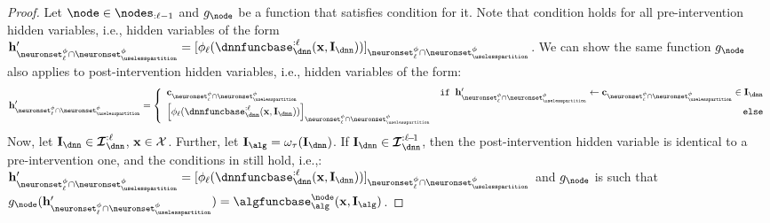 \begin{proof}
    Let $\node \in \nodes_{:\layer-1}$ and $g_{\node}$ be a function that satisfies condition  for it.
    Note that condition  holds for all pre-intervention hidden variables, i.e., hidden variables of the form $\hiddenstates'_{\neuronset^{\causalmap}_{\layer} \cap \neuronset^{\causalmap}_{\uselesspartition}} = [\causalmap_{\layer}(\dnnfunclayer{:\layer}(\bx, \interventionsdnn))]_{\neuronset^{\causalmap}_{\layer} \cap \neuronset^{\causalmap}_{\uselesspartition}}$.
    We can show the same function $g_{\node}$ also applies to post-intervention hidden variables, i.e., hidden variables of the form:
    \begin{align}
        \hiddenstates'_{\neuronset^{\causalmap}_{\layer} \cap \neuronset^{\causalmap}_{\uselesspartition}} = 
        \left\{\begin{array}{lr}
            \constants_{\neuronset^{\causalmap}_{\layer} \cap \neuronset^{\causalmap}_{\uselesspartition}} & \texttt{if } \hiddenstates'_{\neuronset^{\causalmap}_{\layer} \cap \neuronset^{\causalmap}_{\uselesspartition}} \leftarrow \constants_{\neuronset^{\causalmap}_{\layer} \cap \neuronset^{\causalmap}_{\uselesspartition}} \in \interventionsdnn \\
            \left[\causalmap_{\layer}
            (\dnnfunclayer{:\layer}
            (\bx, \interventionsdnn))
            \right]_{\neuronset^{\causalmap}_{\layer} \cap \neuronset^{\causalmap}_{\uselesspartition}} 
            & \texttt{else}
        \end{array}\right.
    \end{align}
    Now, let 
    $\interventionsdnn \in \interventionsset^{:\layer}_{\dnn}$, $\mathbf{x} \in \mathcal{X}$.
    Further, let $\interventions_{\alg} = \omega_{\abstractionmap}(\interventionsdnn)$.
    If $\interventionsdnn \in \interventionsset^{:\layer\!-\!1}_{\dnn}$, then the post-intervention hidden variable is identical to a pre-intervention one, and the conditions in  still hold, i.e.,: $\hiddenstates'_{\neuronset^{\causalmap}_{\layer} \cap \neuronset^{\causalmap}_{\uselesspartition}} = [\causalmap_{\layer}(\dnnfunclayer{:\layer}(\bx, \interventionsdnn))]_{\neuronset^{\causalmap}_{\layer} \cap \neuronset^{\causalmap}_{\uselesspartition}}$ and $g_{\node}$ is such that
    $g_{\node}(\hiddenstates'_{\neuronset^{\causalmap}_{\layer} \cap \neuronset^{\causalmap}_{\uselesspartition}}) = \algfuncnode{\node}(\bx, \interventions_{\alg})$.

\end{proof}
